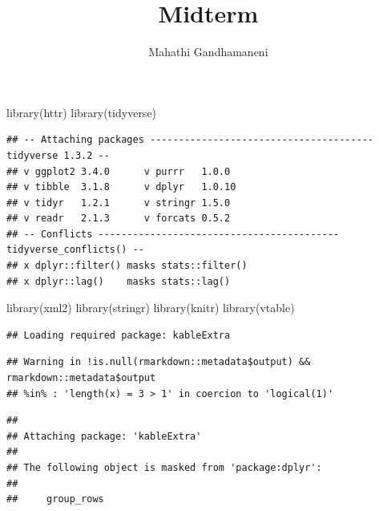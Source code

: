 \documentclass[
]{article}
\title{Midterm}
\author{Mahathi Gandhamaneni}
\date{}
\newenvironment{Shaded}{\begin{snugshade}}{\end{snugshade}}
\newcommand{\FunctionTok}[1]{\textcolor[rgb]{0.00,0.00,0.00}{#1}}
\newcommand{\NormalTok}[1]{#1}
\begin{document}
\maketitle

\begin{Shaded}
\begin{Highlighting}[]
\FunctionTok{library}\NormalTok{(httr)}
\FunctionTok{library}\NormalTok{(tidyverse)}
\end{Highlighting}
\end{Shaded}

\begin{verbatim}
## -- Attaching packages --------------------------------------- tidyverse 1.3.2 --
## v ggplot2 3.4.0      v purrr   1.0.0 
## v tibble  3.1.8      v dplyr   1.0.10
## v tidyr   1.2.1      v stringr 1.5.0 
## v readr   2.1.3      v forcats 0.5.2 
## -- Conflicts ------------------------------------------ tidyverse_conflicts() --
## x dplyr::filter() masks stats::filter()
## x dplyr::lag()    masks stats::lag()
\end{verbatim}

\begin{Shaded}
\begin{Highlighting}[]
\FunctionTok{library}\NormalTok{(xml2)}
\FunctionTok{library}\NormalTok{(stringr)}
\FunctionTok{library}\NormalTok{(knitr)}
\FunctionTok{library}\NormalTok{(vtable)}
\end{Highlighting}
\end{Shaded}

\begin{verbatim}
## Loading required package: kableExtra
\end{verbatim}

\begin{verbatim}
## Warning in !is.null(rmarkdown::metadata$output) && rmarkdown::metadata$output
## %in% : 'length(x) = 3 > 1' in coercion to 'logical(1)'
\end{verbatim}

\begin{verbatim}
## 
## Attaching package: 'kableExtra'
## 
## The following object is masked from 'package:dplyr':
## 
##     group_rows
\end{verbatim}
\end{document}
